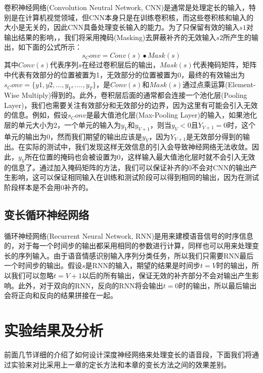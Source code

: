 卷积神经网络(Convolution Neutral Network, CNN)是通常是处理定长的输入，特别是在计算机视觉领域，但CNN本身只是在训练卷积核，而这些卷积核和输入的大小是无关的，因此CNN具备处理变长输入的能力。为了只保留有效的输入$s1$对输出结果的影响，，我们将采用掩码(Masking)去屏蔽补齐的无效输入$s2$所产生的输出，如下面的公式所示：
\begin{equation}
\label{equ:cnn_mask}
    s_Conv = Conv(s) \bullet Mask(s)
\end{equation}
其中$Conv(s)$代表序列$s$在经过卷积层后的输出，$Mask(s)$代表掩码矩阵，矩阵中代表有效部分的位置被置为1，无效部分的位置被置为0，最终的有效输出为$s_Conv=\{y1,y2,...,y_V,....,y_T\}$，是$Conv(s)$和$Mask(s)$通过点乘运算(Element-Wise Multiply)得到的。此外，卷积层后面的通常都会连接一个池化层(Pooling Layer)，我们也需要关注有效部分和无效部分的边界，因为这里有可能会引入无效的信息。例如，假设$s_Conv$是最大值池化层(Max-Pooling Layer)的输入，如果池化层的单元大小为2，一个单元的输入为$y_V$和$y_{V+1}$，则当$y_V<0$且$Y_{V+1}=0$时，这个单元的输出为0，然而我们期望的输出应该是$y_V$，因为$Y_{V+1}$是无效部分得到的输出。在实际的测试中，我们发现这样无效信息的引入会导致神经网络无法收敛。因此，$y_V$所在位置的掩码也会被设置为0，这样输入最大值池化层时就不会引入无效的信息了。通过加入掩码矩阵的方法，我们可以保证补齐的0不会对CNN的输出产生影响，这可以保证相同输入在训练和测试阶段可以得到相同的输出，因为在测试阶段样本是不会用0补齐的。

\subsection{变长循环神经网络}
\label{ssec:var_len_rnn}

循环神经网络(Recurrent Neural Network, RNN)是用来建模语音信号的时序信息的，对于每一个时间步的输出都采用相同的参数进行计算，同样也可以用来处理变长的序列输入。由于语音情感识别输入序列分类任务，所以我们只需要RNN最后一个时间步的输出。假设$s$是RNN的输入，期望的结果是时间步$t=V$时的输出，所以我们可以忽略$t=V+1$以后的所有输出，保证无效的补齐部分不会对输出产生影响。此外，对于双向的RNN，反向的RNN将会输出$t=0$时的输出，所以最后输出会将正向和反向的结果拼接在一起。

\section{实验结果及分析}
\label{sec:var_len_experiment}

前面几节详细的介绍了如何设计深度神经网络来处理变长的语音段，下面我们将通过实验来对比采用上一章的定长方法和本章的变长方法之间的效果差别。

